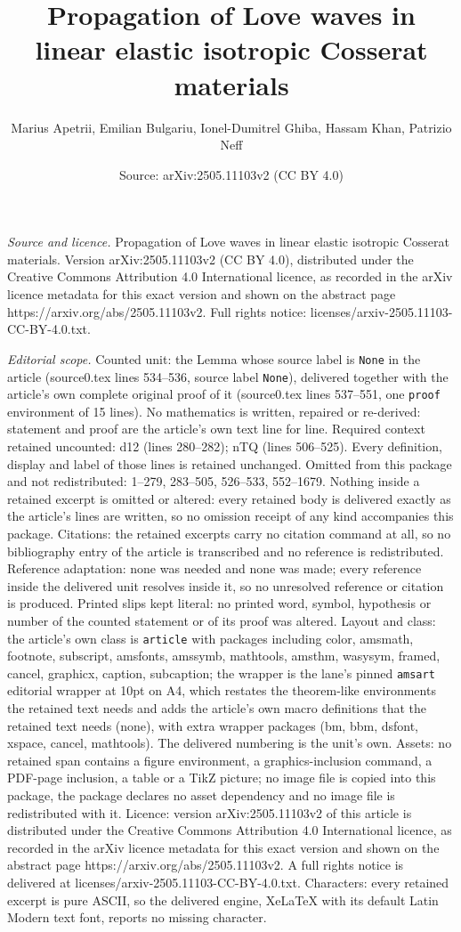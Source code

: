 \documentclass[10pt,a4paper]{amsart}
\title[Propagation of Love waves in linear elastic isotropic Cosser]{Propagation of Love waves in linear elastic isotropic Cosserat materials}
\author{Marius Apetrii, Emilian Bulgariu, Ionel-Dumitrel Ghiba, Hassam Khan, Patrizio Neff}
\date{Source: arXiv:2505.11103v2 (CC BY 4.0)}
\begin{document}
\maketitle

\noindent\emph{Source and licence.} Propagation of Love waves in linear elastic isotropic Cosserat materials. Version arXiv:2505.11103v2 (CC BY 4.0), distributed under the Creative Commons Attribution 4.0 International licence, as recorded in the arXiv licence metadata for this exact version and shown on the abstract page https://arxiv.org/abs/2505.11103v2. Full rights notice: licenses/arxiv-2505.11103-CC-BY-4.0.txt.\par\smallskip

\noindent\textit{Editorial scope.} Counted unit: the Lemma whose source label is \texttt{None} in the article (source0.tex lines 534--536, source label \texttt{None}), delivered together with the article's own complete original proof of it (source0.tex lines 537--551, one \texttt{proof} environment of 15 lines). No mathematics is written, repaired or re-derived: statement and proof are the article's own text line for line. Required context retained uncounted: d12 (lines 280--282); nTQ (lines 506--525). Every definition, display and label of those lines is retained unchanged. Omitted from this package and not redistributed: 1--279, 283--505, 526--533, 552--1679. Nothing inside a retained excerpt is omitted or altered: every retained body is delivered exactly as the article's lines are written, so no omission receipt of any kind accompanies this package. Citations: the retained excerpts carry no citation command at all, so no bibliography entry of the article is transcribed and no reference is redistributed. Reference adaptation: none was needed and none was made; every reference inside the delivered unit resolves inside it, so no unresolved reference or citation is produced. Printed slips kept literal: no printed word, symbol, hypothesis or number of the counted statement or of its proof was altered. Layout and class: the article's own class is \texttt{article} with packages including color, amsmath, footnote, subscript, amsfonts, amssymb, mathtools, amsthm, wasysym, framed, cancel, graphicx, caption, subcaption; the wrapper is the lane's pinned \texttt{amsart} editorial wrapper at 10pt on A4, which restates the theorem-like environments the retained text needs and adds the article's own macro definitions that the retained text needs (none), with extra wrapper packages (bm, bbm, dsfont, xspace, cancel, mathtools). The delivered numbering is the unit's own. Assets: no retained span contains a figure environment, a graphics-inclusion command, a PDF-page inclusion, a table or a TikZ picture; no image file is copied into this package, the package declares no asset dependency and no image file is redistributed with it. Licence: version arXiv:2505.11103v2 of this article is distributed under the Creative Commons Attribution 4.0 International licence, as recorded in the arXiv licence metadata for this exact version and shown on the abstract page https://arxiv.org/abs/2505.11103v2. A full rights notice is delivered at licenses/arxiv-2505.11103-CC-BY-4.0.txt. Characters: every retained excerpt is pure ASCII, so the delivered engine, XeLaTeX with its default Latin Modern text font, reports no missing character.
\end{document}
